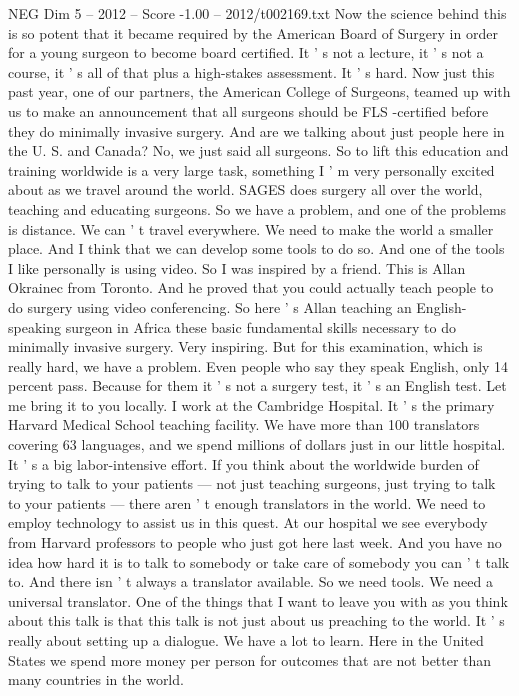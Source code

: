 \begin{textsample}{NEG Dim 5 – 2012 – Score -1.00 – 2012/t002169.txt}
Now the science behind this is so potent that it became required by the American Board of Surgery in order for a young surgeon to become board certified.
It ' s not a lecture, it ' s not a course, it ' s all of that plus a high-stakes assessment.
It ' s hard.
Now just this past year, one of our partners, the American College of Surgeons, teamed up with us to make an announcement that all surgeons should be FLS -certified before they do minimally invasive surgery.
And are we talking about just people here in the U.
S. and Canada?
No, we just said all surgeons.
So to lift this education and training worldwide is a very large task, something I ' m very personally excited about as we travel around the world.
SAGES does surgery all over the world, teaching and educating surgeons.
So we have a problem, and one of the problems is distance.
We can ' t travel everywhere.
We need to make the world a smaller place.
And I think that we can develop some tools to do so.
And one of the tools I like personally is using video.
So I was inspired by a friend.
This is Allan Okrainec from Toronto.
And he proved that you could actually teach people to do surgery using video conferencing.
So here ' s Allan teaching an English-speaking surgeon in Africa these basic fundamental skills necessary to do minimally invasive surgery.
Very inspiring.
But for this examination, which is really hard, we have a problem.
Even people who say they speak English, only 14 percent pass.
Because for them it ' s not a surgery test, it ' s an English test.
Let me bring it to you locally.
I work at the Cambridge Hospital.
It ' s the primary Harvard Medical School teaching facility.
We have more than 100 translators covering 63 languages, and we spend millions of dollars just in our little hospital.
It ' s a big labor-intensive effort.
If you think about the worldwide burden of trying to talk to your patients — not just teaching surgeons, just trying to talk to your patients — there aren ' t enough translators in the world.
We need to employ technology to assist us in this quest.
At our hospital we see everybody from Harvard professors to people who just got here last week.
And you have no idea how hard it is to talk to somebody or take care of somebody you can ' t talk to.
And there isn ' t always a translator available.
So we need tools.
We need a universal translator.
One of the things that I want to leave you with as you think about this talk is that this talk is not just about us preaching to the world.
It ' s really about setting up a dialogue.
We have a lot to learn.
Here in the United States we spend more money per person for outcomes that are not better than many countries in the world.

\end{textsample}
